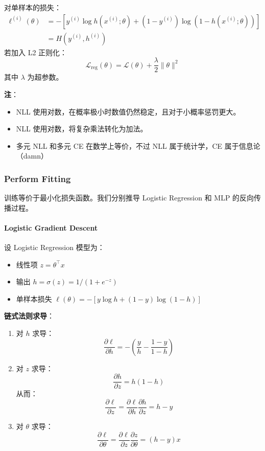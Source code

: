 对单样本的损失： \[
  \begin{aligned}
    \ell^{(i)}(\theta)
     & = -\left[ y^{(i)}\log h(x^{(i)}; \theta) + (1-y^{(i)})\log(1-h(x^{(i)}; \theta)) \right] \\
     & = H(y^{(i)}, h^{(i)})
  \end{aligned}
\] 若加入 L2 正则化： \[
  \mathcal{L}_{\text{reg}}(\theta) = \mathcal{L}(\theta) + \frac{\lambda}{2}\|\theta\|^2
\] 其中 \(\lambda\) 为超参数。

\textbf{注}：

\begin{itemize}
  \tightlist
  \item
        NLL 使用对数，在概率极小时数值仍然稳定，且对于小概率惩罚更大。
  \item
        NLL 使用对数，将复杂乘法转化为加法。
  \item
        多元 NLL 和多元 CE 在数学上等价，不过 NLL 属于统计学，CE
        属于信息论（damn）
\end{itemize}

\subsubsection{Perform Fitting}\label{perform-fitting}

训练等价于最小化损失函数。我们分别推导 Logistic Regression 和 MLP
的反向传播过程。

\paragraph{Logistic Gradient Descent}\label{logistic-gradient-descent}

设 Logistic Regression 模型为：

\begin{itemize}
  \tightlist
  \item
        线性项 \(z = \theta^\top x\)
  \item
        输出 \(h = \sigma(z) = 1/(1+e^{-z})\)
  \item
        单样本损失 \(\ell(\theta) = -[ y\log h + (1-y)\log(1-h) ]\)
\end{itemize}

\textbf{链式法则求导}：

\begin{enumerate}
  \def\labelenumi{\arabic{enumi}.}
  \tightlist
  \item
        对 \(h\) 求导： \[
          \frac{\partial \ell}{\partial h} = -\left(\frac{y}{h} - \frac{1-y}{1-h}\right)
        \]
  \item
        对 \(z\) 求导： \[
          \frac{\partial h}{\partial z} = h(1 - h)
        \] 从而： \[
          \frac{\partial \ell}{\partial z}
          = \frac{\partial \ell}{\partial h} \frac{\partial h}{\partial z}
          = h - y
        \]
  \item
        对 \(\theta\) 求导： \[
          \frac{\partial \ell}{\partial \theta}
          = \frac{\partial \ell}{\partial z} \frac{\partial z}{\partial \theta}
          = (h - y) x
        \]
\end{enumerate}


